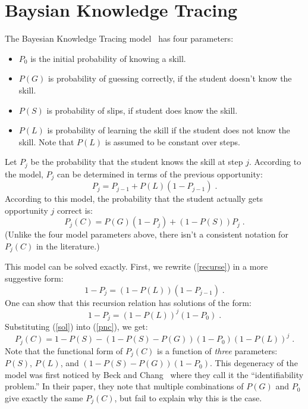 \documentclass[11pt,letterpaper]{article}
\begin{document}
\section{Baysian Knowledge Tracing}

The Bayesian Knowledge Tracing model~\cite{anderson} has four parameters:
%
\begin{itemize}
   \item $P_0$ is the initial probability of knowing a skill.
   \item $P(G)$ is probability of guessing correctly, if the student        
         doesn't know the skill.
   \item $P(S)$ is probability of slips, if student does know the skill.
   \item $P(L)$ is probability of learning the skill if the student 
         does not know the skill.  Note that $P(L)$ is assumed to 
         be constant over steps.
\end{itemize}
%
Let $P_j$ be the probability that the student knows the skill at 
step $j$. According to the model,  $P_j$ can
be determined in terms of the previous opportunity:
%
\begin{equation}
          P_j = P_{j-1} + P(L)\left(1-P_{j-1}\right)  \; . \label{recurse}
\end{equation}
%
According to this model, the probability that the student actually gets
opportunity $j$ correct is:
%
\begin{equation}
         P_j(C) = P(G)\left(1-P_j\right) + \left(1-P(S)\right) P_j \; . \label{pnc}
\end{equation}
%
(Unlike the four model parameters above, there isn't a consistent
notation for $P_j(C)$ in the literature.)

This model can be  solved exactly.  First, we rewrite (\ref{recurse}) in a
more suggestive form:
%
\begin{equation}
        1-P_j = \left(1-P(L)\right) \left(1-P_{j-1}\right) \; .
\end{equation}
%
One can show that this recursion relation has solutions of the form:
%
\begin{equation}
            1-P_j = \left(1-P(L)\right)^j\left(1-P_0\right) \; .
	    \label{sol}
\end{equation}
%
%
Substituting (\ref{sol}) into (\ref{pnc}), we get:
%
\begin{equation}
         P_j(C) = 1-P(S) -\left(1-P(S)-P(G)\right) \left(1-P_0\right)
                   \left(1-P(L)\right)^j \; . \label{pncsoln}
\end{equation}
%
Note that the functional form of $P_j(C)$ is a function of {\em three}
parameters:  $P(S)$, $P(L)$, and $\left(1-P(S)-P(G)\right) \left(1-P_0\right)$.
This degeneracy of the model was first noticed by Beck and 
Chang~\cite{beckchang} where they call it the ``identifiability
problem.''   In their paper, they note that multiple
combinations of $P(G)$ and $P_0$ give exactly the same $P_j(C)$, but
fail to explain why this is the case.
\end{document}
